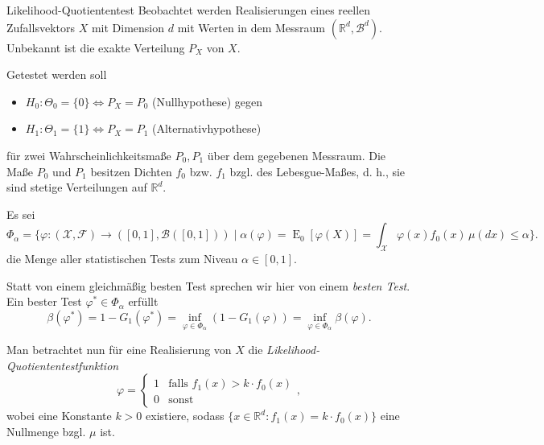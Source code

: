 \begin{defi}{Likelihood-Quotiententest}
    Beobachtet werden Realisierungen eines reellen Zufallsvektors $X$ mit Dimension $d$ mit Werten in dem Messraum $(\mathbb{R}^d, \mathcal{B}^d)$.
    Unbekannt ist die exakte Verteilung $P_X$ von $X$.

    Getestet werden soll
    \begin{itemize}
        \item $H_0: \Theta_0 = \{ 0 \} \iff P_X = P_0$ (Nullhypothese) gegen
        \item $H_1: \Theta_1 = \{ 1 \} \iff P_X = P_1$ (Alternativhypothese)
    \end{itemize}
    für zwei Wahrscheinlichkeitsmaße $P_0, P_1$ über dem gegebenen Messraum.
    Die Maße $P_0$ und $P_1$ besitzen Dichten $f_0$ bzw. $f_1$ bzgl. des Lebesgue-Maßes, d. h., sie sind stetige Verteilungen auf $\mathbb{R}^d$.

    Es sei
    \[
        \Phi_{\alpha} = \{\varphi: (\mathcal{X}, \mathcal{F}) \to ([0, 1], \mathcal{B}([0, 1])) \mid \alpha(\varphi) = \operatorname{E}_{0}[\varphi(X)] = \int_{\mathcal{X}} \varphi(x) f_0(x) \, \mu(dx) \leq \alpha \}.
    \]
    die Menge aller statistischen Tests zum Niveau $\alpha \in [0, 1]$.

    Statt von einem gleichmäßig besten Test sprechen wir hier von einem \emph{besten Test}.
    Ein bester Test $\varphi^* \in \Phi_{\alpha}$ erfüllt
    \[
        \beta(\varphi^*) = 1 - G_{1}(\varphi^*) = \inf_{\varphi \in \Phi_{\alpha}} (1 - G_{1}(\varphi)) = \inf_{\varphi \in \Phi_{\alpha}} \beta(\varphi).
    \]

    Man betrachtet nun für eine Realisierung von $X$ die \emph{Likelihood-Quotiententestfunktion}
    \[
        \varphi = \begin{cases}
            1 & \text{falls } f_1(x) > k \cdot f_0(x) \\
            0 & \text{sonst}
        \end{cases},
    \]
    wobei eine Konstante $k > 0$ existiere, sodass $\{ x \in \mathbb{R}^d : f_1(x) = k \cdot f_0(x) \}$ eine Nullmenge bzgl. $\mu$ ist.
\end{defi}

